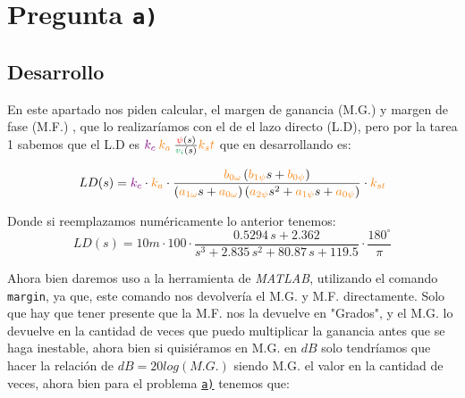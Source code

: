 \section{Pregunta \texttt{a)}}\label{pregunta-a}

\subsection{Desarrollo}

En este apartado nos piden calcular, el margen de ganancia (M.G.) y margen de fase (M.F.) , que lo realizaríamos con el de el lazo directo (L.D), pero por la tarea 1\cite{tarea-1-sdc} sabemos que el L.D es  \( \mora{k_c} \nara{ k_a} \frac{\rojo{\psi}(s)}{\verd{v_i}(s)}\nara{k_st} \) que en desarrollando es:


\begin{equation}
  LD(s) = \mora{k_c} \cdot \nara{k_a} \cdot \frac{\nara{b_{0\omega}} \left(\nara{b_{1\psi}}s + \nara{b_{0\psi}}\right)}
  {\left(\nara{a_{1\omega}}s + \nara{a_{0\omega}}\right)\left(\nara{a_{2\psi}}s^2 + \nara{a_{1\psi}}s + \nara{a_{0\psi}}\right)} \cdot \nara{k_{st}}
\end{equation}

Donde si reemplazamos numéricamente lo anterior tenemos: 
\begin{equation}
  LD(s) = 10m \cdot 100 \cdot \frac{0.5294 \, s + 2.362}{s^3 + 2.835 \, s^2 + 80.87 \, s + 119.5} \cdot \frac{180^{\circ}}{\pi}
\end{equation}

Ahora bien daremos uso a la herramienta de \textit{MATLAB}, utilizando el comando \verb|margin|, ya que, este comando nos devolvería el M.G. y M.F. directamente. Solo que hay que tener presente que la M.F. nos la devuelve en "Grados", y el M.G. lo devuelve en la cantidad de veces que puedo multiplicar la ganancia antes que se haga inestable, ahora bien si quisiéramos en M.G. en $dB$ solo tendríamos que hacer la relación de \(dB = 20log(M.G.)\) siendo M.G. el valor en la cantidad de veces, ahora bien para el problema \hyperref[pregunta-a]{\texttt{a)}}  tenemos que:

\vspace*{0.25cm}


